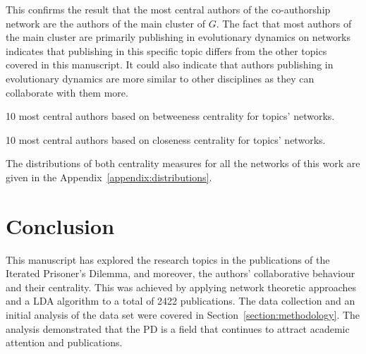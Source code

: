 \documentclass{article}
\theoremstyle{definition}
\begin{document}
This confirms the result that the most central authors of 
the co-authorship network are the authors of the main cluster of \(G\).
The fact that most authors of the main cluster are primarily publishing in
evolutionary dynamics on networks indicates that publishing in this specific
topic differs from the other topics covered in this manuscript. It could also
indicate that authors publishing in evolutionary dynamics are more similar to other
disciplines as they can collaborate with them more.

\begin{table}[!hbtp]
    \begin{center}
    \resizebox{.9\textwidth}{!}{}
\end{center}
\caption{10 most central authors based on betweeness centrality
for topics' networks.}\label{table:central_authors_topics_bt}
\end{table}

\begin{table}[!hbtp]
    \begin{center}
    \resizebox{.9\textwidth}{!}{}
\end{center}
\caption{10 most central authors based on closeness centrality
for topics' networks.}\label{table:central_authors_topics_cl}
\end{table}

The distributions of both centrality measures for all the networks of this
work are given in the Appendix~\ref{appendix:distributions}.

\section{Conclusion}\label{section:conclusion}

This manuscript has explored the research topics in the publications of the
Iterated Prisoner's Dilemma, and moreover, the authors' collaborative behaviour
and their centrality. This was achieved by
applying network theoretic approaches and a LDA algorithm to a total of 2422
publications.
The data collection and an initial analysis of the data set were covered in
Section~\ref{section:methodology}. The analysis  demonstrated that the PD is a
field that continues to attract academic attention and publications.
\end{document}
